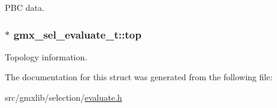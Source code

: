 \-P\-B\-C data. \hypertarget{structgmx__sel__evaluate__t_ab7bbf1e19ee0c03e5adfb79f0cb4f234}{
\subsubsection[{top}]{$\ast$ {\bf gmx\-\_\-sel\-\_\-evaluate\-\_\-t\-::top}}}\label{structgmx__sel__evaluate__t_ab7bbf1e19ee0c03e5adfb79f0cb4f234}
\-Topology information. 

\-The documentation for this struct was generated from the following file\-:\begin{DoxyCompactItemize}
\item 
src/gmxlib/selection/\hyperlink{evaluate_8h}{evaluate.\-h}\end{DoxyCompactItemize}
